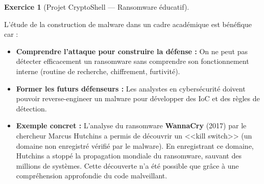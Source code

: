 \documentclass[a4paper,11pt]{article}
\theoremstyle{plain}
\theoremstyle{definition}
\newtheorem{exercice}{Exercice}
\begin{document}
\begin{exercice}[Projet CryptoShell --- Ransomware éducatif]
\begin{correction}
L'étude de la construction de malware dans un cadre académique est bénéfique car :
\begin{itemize}
    \item \textbf{Comprendre l'attaque pour construire la défense :} On ne peut pas détecter efficacement un ransomware sans comprendre son fonctionnement interne (routine de recherche, chiffrement, furtivité).
    \item \textbf{Former les futurs défenseurs :} Les analystes en cybersécurité doivent pouvoir reverse-engineer un malware pour développer des IoC et des règles de détection.
    \item \textbf{Exemple concret :} L'analyse du ransomware \textbf{WannaCry} (2017) par le chercheur Marcus Hutchins a permis de découvrir un <<kill switch>> (un domaine non enregistré vérifié par le malware). En enregistrant ce domaine, Hutchins a stoppé la propagation mondiale du ransomware, sauvant des millions de systèmes. Cette découverte n'a été possible que grâce à une compréhension approfondie du code malveillant.
\end{itemize}

\end{correction}


\end{exercice}
\end{document}
